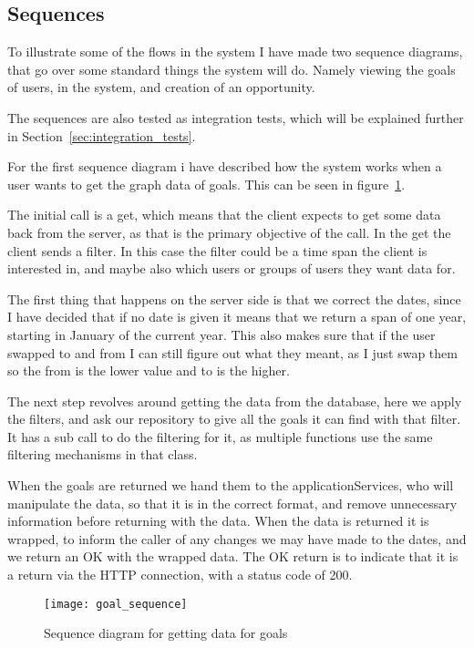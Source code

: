 \subsection{Sequences}
\label{subsec:sequences}
To illustrate some of the flows in the system I have made two sequence diagrams,
that go over some standard things the system will do. Namely viewing the goals
of users, in the system, and creation of an opportunity.

The sequences are also tested as integration tests, which will be explained
further in Section~\ref{sec:integration_tests}.

For the first sequence diagram i have described how the system works when a user
wants to get the graph data of goals. This can be seen in
figure~\ref{fig:goal_sequence}.

The initial call is a get, which means that the client expects to get some data
back from the server, as that is the primary objective of the call. In the get
the client sends a filter. In this case the filter could be a time span the client is
interested in, and maybe also which users or groups of users they want data for.

The first thing that happens on the server side is that we correct the dates,
since I have decided that if no date is given it means that we return a span of
one year, starting in January of the current year. This also makes sure that if
the user swapped to and from I can still figure out what they meant, as I just
swap them so the from is the lower value and to is the higher. 

The next step revolves around getting the data from the database, here we apply
the filters, and ask our repository to give all the goals it can find with that
filter. It has a sub call to do the filtering for it, as multiple functions use
the same filtering mechanisms in that class.

When the goals are returned we hand them to the applicationServices, who will
manipulate the data, so that it is in the correct format, and remove unnecessary
information before returning with the data. When the data is returned it is
wrapped, to inform the caller of any changes we may have made to the dates, and
we return an OK with the wrapped data. The OK return is to indicate that it is a
return via the HTTP connection, with a status code of 200.

\begin{figure}[!htbp]
\centering
\texttt{[image: goal\_sequence]}
\caption{Sequence diagram for getting data for goals}
\label{fig:goal_sequence}
\end{figure}

